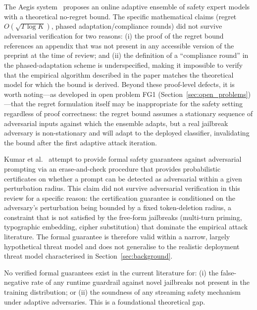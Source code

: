 The Aegis system~\cite{su2024aegis} proposes an online adaptive ensemble of safety
expert models with a theoretical no-regret bound.
The specific mathematical claims (regret $O(\sqrt{T \log K})$, phased
adaptation/compliance rounds) did not survive adversarial verification for two
reasons: (i) the proof of the regret bound references an appendix that was not
present in any accessible version of the preprint at the time of review; and
(ii) the definition of a ``compliance round'' in the phased-adaptation scheme is
underspecified, making it impossible to verify that the empirical algorithm
described in the paper matches the theoretical model for which the bound is derived.
Beyond these proof-level defects, it is worth noting---as developed in
open problem FG1 (Section~\ref{sec:open_problems})---that the regret formulation
itself may be inappropriate for the safety setting regardless of proof correctness:
the regret bound assumes a stationary sequence of adversarial inputs against which
the ensemble adapts, but a real jailbreak adversary is non-stationary and will
adapt to the deployed classifier, invalidating the bound after the first adaptive
attack iteration.

Kumar et al.~\cite{kumar2023certifying} attempt to provide formal safety
guarantees against adversarial prompting via an erase-and-check procedure that
provides probabilistic certificates on whether a prompt can be detected as
adversarial within a given perturbation radius.
This claim did not survive adversarial verification in this review for a specific
reason: the certification guarantee is conditioned on the adversary's perturbation
being bounded by a fixed token-deletion radius, a constraint that is not satisfied
by the free-form jailbreaks (multi-turn priming, typographic embedding, cipher
substitution) that dominate the empirical attack literature.
The formal guarantee is therefore valid within a narrow, largely hypothetical
threat model and does not generalise to the realistic deployment threat model
characterised in Section~\ref{sec:background}.

No verified formal guarantees exist in the current literature for:
(i) the false-negative rate of any runtime guardrail against novel jailbreaks
not present in the training distribution; or
(ii) the soundness of any streaming safety mechanism under adaptive adversaries.
This is a foundational theoretical gap.
